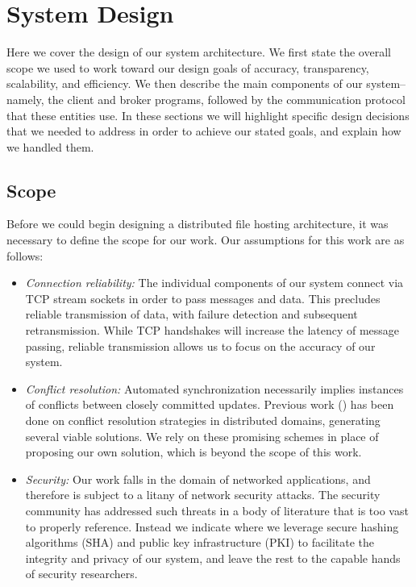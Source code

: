 \section{System Design}
\label{design}
Here we cover the design of our system architecture.
We first state the overall scope we used to work toward our design goals of accuracy, transparency, scalability, and efficiency.
We then describe the main components of our system--namely, the client and broker
programs, followed by the communication protocol that these entities use.
In these sections we will highlight specific design decisions that we needed to address
in order to achieve our stated goals,
and explain how we handled them.

\subsection{Scope}
Before we could begin designing a distributed file hosting architecture,
it was necessary to define the scope for our work.
Our assumptions for this work are as follows:
\begin{itemize}
    \item \emph{Connection reliability:} The individual components of our system
    connect via TCP stream sockets in order to pass messages and data.
    This precludes reliable transmission of data, with failure detection
    and subsequent retransmission. While TCP handshakes will increase
    the latency of message passing, reliable transmission allows
    us to focus on the accuracy of our system.
    \item \emph{Conflict resolution:} Automated synchronization necessarily implies
    instances of conflicts between closely committed updates.
    Previous work (\cite{shakib1998system,hurley2004collaborative}) has been done on conflict resolution strategies in distributed domains,
    generating several viable solutions.
    We rely on these promising schemes in place of proposing our own solution,
    which is beyond the scope of this work.
    \item \emph{Security:} Our work falls in the domain
    of networked applications, and therefore is subject
    to a litany of network security attacks.
    The security community has addressed such threats
    in a body of literature that is too vast to properly reference.
    Instead we indicate where we leverage secure hashing algorithms (SHA)
    and public key infrastructure (PKI) to facilitate
    the integrity and privacy of our system,
    and leave the rest to the capable hands of security researchers.
    \end{itemize}

